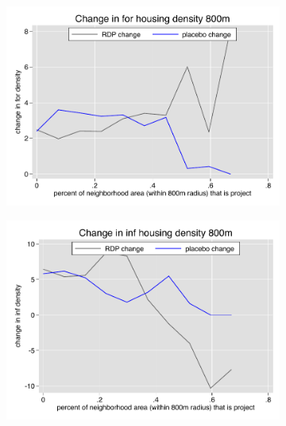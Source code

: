 \documentclass[12pt]{article}
\begin{document}
\begin{figure}
        \vspace{-6mm}
        \begin{subfigure}[b]{0.495\textwidth}
            \centering
            \includegraphics[width=\textwidth,trim={0.3cm .3cm 0.1cm 0cm}, clip=true]{figures/change_for_800_local.pdf}
        \end{subfigure}
        \hfill
        \begin{subfigure}[b]{0.495\textwidth}  
            \centering 
            \includegraphics[width=\textwidth,trim={0.3cm .3cm 0.1cm 0cm}, clip=true]{figures/change_inf_800_local.pdf}
        \end{subfigure}
        \vspace{-6mm}
    \end{figure} 
\end{document}
